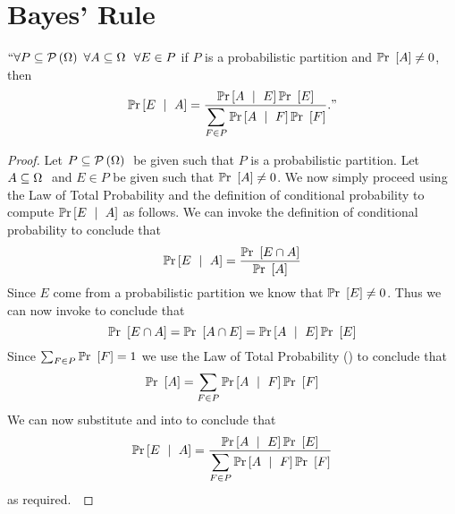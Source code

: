     \section{Bayes' Rule}
        \begin{theorem}
            $``\forall P \subseteq \mathcal{P}\left(\Omega\right) \  \forall A \subseteq \Omega \  \ \forall E \in P$
            if $P$ is a probabilistic partition and $\mathbb{P}\mathrm{r}~\left[A\right] \neq 0$, then 
            \[
                \mathbb{P}\mathrm{r}\left[E~\mid~A\right] = \dfrac{\mathbb{P}\mathrm{r}\left[A~\mid~E\right] \mathbb{P}\mathrm{r}~\left[E\right]}{\displaystyle\sum_{F \in P} \mathbb{P}\mathrm{r}\left[A~\mid~F\right] \mathbb{P}\mathrm{r}~\left[F\right]}."
            \]
        \end{theorem}
        \begin{proof}
            Let $P \subseteq \mathcal{P}\left(\Omega\right) \ $ be given such that $P$ is a probabilistic partition.
            Let $A \subseteq \Omega \ $ and $E \in P$ be given such that $\mathbb{P}\mathrm{r}~\left[A\right] \neq 0$. We 
            now simply proceed using  the Law of Total Probability and the definition of
            conditional probability to compute $\mathbb{P}\mathrm{r}\left[E~\mid~A\right]$ as follows. We can 
            invoke the definition of conditional probability to conclude that
            \begin{equation}
                \mathbb{P}\mathrm{r}\left[E~\mid~A\right] = \frac{\mathbb{P}\mathrm{r}~\left[E \cap A\right]}{\mathbb{P}\mathrm{r}~\left[A\right]}
                \label{Baye's Rule equation 1}
            \end{equation}
            Since $E$ come from a probabilistic partition we know that $\mathbb{P}\mathrm{r}~\left[E\right] \neq 0$.
            Thus we can now invoke  to conclude that
            \begin{equation}
                \mathbb{P}\mathrm{r}~\left[E \cap A\right] = \mathbb{P}\mathrm{r}~\left[A \cap E\right] = \mathbb{P}\mathrm{r}\left[A~\mid~E\right] \mathbb{P}\mathrm{r}~\left[E\right]
                \label{Baye's Rule equation 3}
            \end{equation}
            Since $\sum_{F \in P} \mathbb{P}\mathrm{r}~\left[F\right] = 1$ we use the Law of Total Probability
            () to conclude that
            \begin{equation}
                \mathbb{P}\mathrm{r}~\left[A\right] = \sum_{F \in P} \mathbb{P}\mathrm{r}\left[A~\mid~F\right] \mathbb{P}\mathrm{r}~\left[F\right]
                \label{Baye's Rule equation 4}
            \end{equation}
            We can now substitute 
            and  into 
            to conclude that
            \[
                \mathbb{P}\mathrm{r}\left[E~\mid~A\right] = \frac{\mathbb{P}\mathrm{r}\left[A~\mid~E\right] \mathbb{P}\mathrm{r}~\left[E\right]}{\displaystyle\sum_{F \in P} \mathbb{P}\mathrm{r}\left[A~\mid~F\right] \mathbb{P}\mathrm{r}~\left[F\right]}
            \]
            as required.~\QED
        \end{proof}
